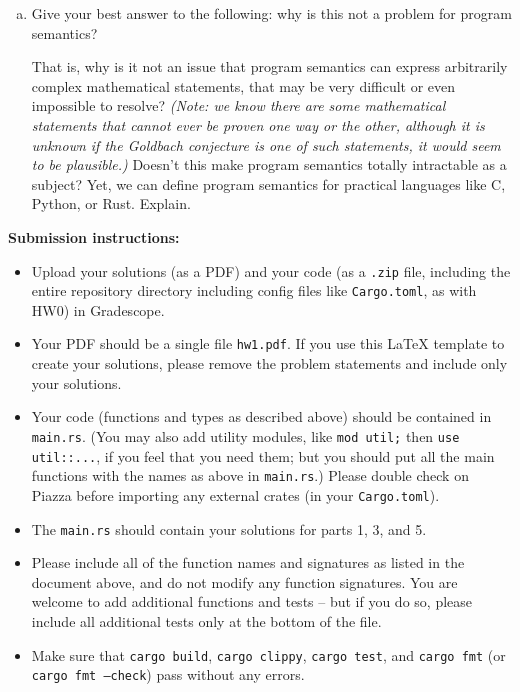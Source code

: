 \documentclass{article}
\begin{document}
\begin{enumerate}
\begin{enumerate}[(a)]
\item Give your best answer to the following:
why is this not a problem for program semantics?

That is, why is it not an issue that program semantics can express arbitrarily complex mathematical statements, that may
be very difficult or even impossible to resolve? \emph{(Note: we know there are some mathematical statements that cannot ever
be proven one way or the other, although it is unknown if the Goldbach conjecture is one of such statements, it would seem to be plausible.)}
Doesn't this make program semantics totally intractable as a subject?
Yet, we can define program semantics for practical languages like C, Python, or Rust.
Explain.
\end{enumerate}


\end{enumerate}

\newpage

\noindent
\textbf{Submission instructions:}
\begin{itemize}
\item Upload your solutions (as a PDF) and your code (as a \texttt{.zip} file, including the entire repository directory including config files like \texttt{Cargo.toml}, as with HW0) in Gradescope.
\item Your PDF should be a single file \texttt{hw1.pdf}. If you use this LaTeX template to create your solutions, please remove the problem statements and include only your solutions.
\item Your code (functions and types as described above) should be contained in \texttt{main.rs}.
(You may also add utility modules, like \texttt{mod util;} then \texttt{use util::...}, if you feel that you need them; but you should put all the main functions with the names as above in \texttt{main.rs}.) Please double check on Piazza before importing any external crates (in your \texttt{Cargo.toml}).

\item The \texttt{main.rs} should contain your solutions for parts 1, 3, and 5.

\item Please include all of the function names and signatures as listed in the document above, and do not modify any function signatures. You are welcome to add additional functions and tests -- but if you do so, please include all additional tests only at the bottom of the file.

\item Make sure that \texttt{cargo build}, \texttt{cargo clippy}, \texttt{cargo test}, and \texttt{cargo fmt} (or \texttt{cargo fmt --check}) pass without any errors.
\end{itemize}
\end{document}
